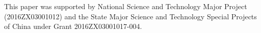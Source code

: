 \documentclass[journal]{IEEEtran}
\begin{document}
This paper was supported by National Science and Technology Major Project (2016ZX03001012) and the State Major Science and Technology Special Projects of China under Grant 2016ZX03001017-004.


\ifCLASSOPTIONcaptionsoff
  \newpage
\fi




\end{document}
